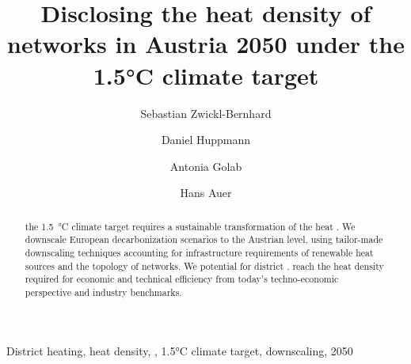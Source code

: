 \documentclass[review]{elsarticle}
\begin{document}
\begin{frontmatter}

\title{Disclosing the heat density of  networks in Austria 2050 under the 1.5°C climate target}
\author[1,2]{Sebastian Zwickl-Bernhard}
\author[2]{Daniel Huppmann}
\author[1]{Antonia Golab}
\author[1]{Hans Auer}
\address[1]{Energy Economics Group (EEG), Technische Universität Wien, Gusshausstrasse 25-29/E370-3, 1040 Wien, Austria}
\address[2]{Energy, Climate and Environment (ECE) Program,  International Institute for Applied Systems Analysis (IIASA), Laxenburg, Austria}

\begin{abstract}
	 the \SI{1.5}{\degreeCelsius} climate target requires a sustainable transformation of the heat . We downscale  European decarbonization scenarios to the Austrian  level, using tailor-made downscaling techniques accounting for infrastructure requirements of renewable heat sources and the topology of  networks.  We  potential for   district .  reach the heat density required for economic and technical efficiency from today's techno-economic perspective and industry benchmarks. 
\end{abstract}

\begin{keyword}
	District heating, heat density, , 1.5°C climate target, downscaling, 2050
\end{keyword}
\end{frontmatter}
\end{document}
